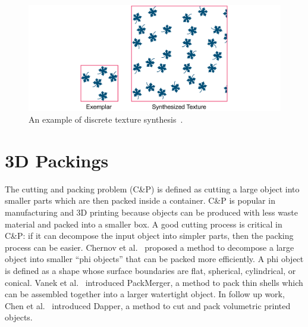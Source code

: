 \begin{figure}
\centering
\includegraphics[width=1.0\textwidth]{figures/related/discrete_texture.pdf} 
\caption[A discrete texture]
{\label{fig_discrete_texture} 
\newtext
{
An example of discrete texture synthesis~\cite{AlMeraj2013}.
}
}
\end{figure}



\section{3D Packings}


\newtext
{
The cutting and packing problem (C\&P) is defined as cutting a large object into smaller parts 
which are then packed inside a container.
C\&P is popular in manufacturing and 3D printing because
objects can be produced with less waste material and packed into a smaller box.
A good cutting process is critical in C\&P: if it can decompose the input object
into simpler parts, then the packing process can be easier.
Chernov et al.~\cite{Chernov2010} proposed a method to decompose a large object
into smaller ``phi objects'' that can be packed more efficiently.
A phi object is defined as a shape whose surface boundaries 
are flat, spherical, cylindrical, or conical.
Vanek et al.~\cite{Vanek2014} introduced PackMerger,
a method to pack thin shells which can be assembled together into
a larger watertight object.
In follow up work, Chen et al.~\cite{Chen2015} introduced Dapper,
a method to cut and pack volumetric printed objects.
}


